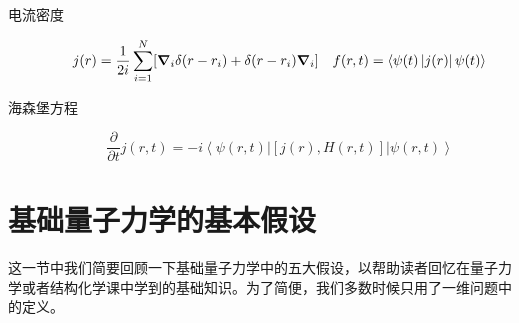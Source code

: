 \documentclass[12pt,a4paper,openany,twoside]{book}
\numberwithin{equation}{section}
\newcommand{\bracketl}[3]{\left\langle #1 \left| #2 \right| #3 \right\rangle}
\begin{document}
        \begin{description}
          \item[电流密度]
            \begin{equation}
              j(r)=\frac{1}{2i}\sum_{i=1}^{N}[\grad_i\delta(r-r_i)+\delta(r-r_i)\grad_i]\quad f(r,t)=\bracketl{\psi(t)}{j(r)}{\psi(t)}
            \end{equation}

          \item[海森堡方程]
            \begin{equation}
              \frac{\partial}{\partial t}j(r,t)=-i\bracketl{\psi(r,t)}{[j(r),H(r,t)]}{\psi(r,t)}
            \end{equation}
        \end{description}

      \section{基础量子力学的基本假设}
        这一节中我们简要回顾一下基础量子力学中的五大假设，以帮助读者回忆在量子力学或者结构化学课中学到的基础知识。为了简便，我们多数时候只用了一维问题中的定义。
\end{document}

